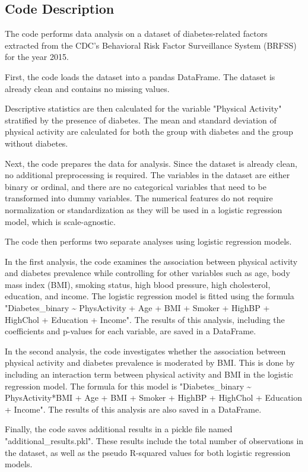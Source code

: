 \documentclass[11pt]{article}
\begin{document}
\subsection{Code Description}

The code performs data analysis on a dataset of diabetes-related factors extracted from the CDC's Behavioral Risk Factor Surveillance System (BRFSS) for the year 2015.

First, the code loads the dataset into a pandas DataFrame. The dataset is already clean and contains no missing values.

Descriptive statistics are then calculated for the variable "Physical Activity" stratified by the presence of diabetes. The mean and standard deviation of physical activity are calculated for both the group with diabetes and the group without diabetes.

Next, the code prepares the data for analysis. Since the dataset is already clean, no additional preprocessing is required. The variables in the dataset are either binary or ordinal, and there are no categorical variables that need to be transformed into dummy variables. The numerical features do not require normalization or standardization as they will be used in a logistic regression model, which is scale-agnostic.

The code then performs two separate analyses using logistic regression models. 

In the first analysis, the code examines the association between physical activity and diabetes prevalence while controlling for other variables such as age, body mass index (BMI), smoking status, high blood pressure, high cholesterol, education, and income. The logistic regression model is fitted using the formula "Diabetes\_binary \textasciitilde{} PhysActivity + Age + BMI + Smoker + HighBP + HighChol + Education + Income". The results of this analysis, including the coefficients and p-values for each variable, are saved in a DataFrame.

In the second analysis, the code investigates whether the association between physical activity and diabetes prevalence is moderated by BMI. This is done by including an interaction term between physical activity and BMI in the logistic regression model. The formula for this model is "Diabetes\_binary \textasciitilde{} PhysActivity*BMI + Age + BMI + Smoker + HighBP + HighChol + Education + Income". The results of this analysis are also saved in a DataFrame.

Finally, the code saves additional results in a pickle file named "additional\_results.pkl". These results include the total number of observations in the dataset, as well as the pseudo R-squared values for both logistic regression models.
\end{document}
